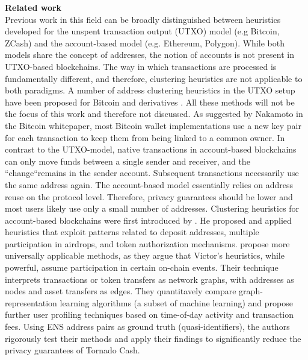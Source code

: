 \documentclass[12pt,a4paper,titlepage,oneside,english]{article}
\begin{document}
\textbf{Related work}\\
Previous work in this field can be broadly distinguished between heuristics developed for the unspent transaction output (UTXO) model (e.g Bitcoin, ZCash) and the account-based model (e.g. Ethereum, Polygon). While both models share the concept of addresses, the notion of accounts is not present in UTXO-based blockchains. The way in which transactions are processed is fundamentally different, and therefore, clustering heuristics are not applicable to both paradigms.
A number of address clustering heuristics in the UTXO setup have been proposed for Bitcoin and derivatives \citep{Androulaki2013, Meiklejohn2013, Haslhofer2016, jourdan2018, kappos2022}. All these methods will not be the focus of this work and therefore not discussed. As suggested by Nakamoto in the Bitcoin whitepaper, most Bitcoin wallet implementations use a new key pair for each transaction to keep them from being linked to a common owner. \newline
In contrast to the UTXO-model, native transactions in account-based blockchains can only move funds between a single sender and receiver, and the ``change``remains in the sender account. Subsequent transactions necessarily use the same address again. The account-based model essentially relies on address reuse on the protocol level. Therefore, privacy guarantees should be lower and most users likely use only a small number of addresses. \citep{Beres2020} \newline
Clustering heuristics for account-based blockchains were first introduced by \cite{FV:17}. He proposed and applied heuristics that exploit patterns related to deposit addresses, multiple participation in airdrops, and token authorization mechanisms. \newline
\cite{Beres2020} propose more universally applicable methods, as they argue that Victor’s heuristics, while powerful, assume participation in certain on-chain events. Their technique interprets transactions or token transfers as network graphs, with addresses as nodes and asset transfers as edges. They quantitavely compare graph-representation learning algorithms (a subset of machine learning) and propose further user profiling techniques based on time-of-day activity and transaction fees. Using ENS address pairs as ground truth (quasi-identifiers), the authors rigorously test their methods and apply their findings to significantly reduce the privacy guarantees of Tornado Cash. \newline
\end{document}
